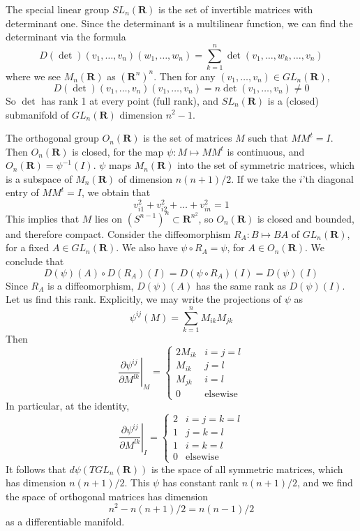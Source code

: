 \begin{example}
    The special linear group $SL_n(\mathbf{R})$ is the set of invertible matrices with determinant one. Since the determinant is a multilinear function, we can find the determinant via the formula
    \[ D(\det)(v_1, \dots, v_n)(w_1, \dots, w_n) = \sum_{k = 1}^n \det(v_1, \dots, w_k, \dots, v_n) \]
    where we see $M_n(\mathbf{R})$ as $(\mathbf{R}^n)^n$. Then for any $(v_1, \dots, v_n) \in GL_n(\mathbf{R})$,
    \[ D(\det)(v_1, \dots, v_n)(v_1, \dots, v_n) = n \det(v_1, \dots, v_n) \neq 0 \]
    So $\det$ has rank 1 at every point (full rank), and $SL_n(\mathbf{R})$ is a (closed) submanifold of $GL_n(\mathbf{R})$ dimension $n^2 - 1$.
\end{example}

\begin{example}
    The orthogonal group $O_n(\mathbf{R})$ is the set of matrices $M$ such that $MM^t = I$. Then $O_n(\mathbf{R})$ is closed, for the map $\psi: M \mapsto MM^t$ is continuous, and $O_n(\mathbf{R}) = \psi^{-1}(I)$. $\psi$ maps $M_n(\mathbf{R})$ into the set of symmetric matrices, which is a subspace of $M_n(\mathbf{R})$ of dimension $n(n+1)/2$. If we take the $i$'th diagonal entry of $MM^t = I$, we obtain that
    \[ v_{i1}^2 + v_{i2}^2 + \dots + v_{in}^2 = 1 \]
    This implies that $M$ lies on $(S^{n-1})^n \subset \mathbf{R}^{n^2}$, so $O_n(\mathbf{R})$ is closed and bounded, and therefore compact. Consider the diffeomorphism $R_A: B \mapsto BA$ of $GL_n(\mathbf{R})$, for a fixed $A \in GL_n(\mathbf{R})$. We also have $\psi \circ R_A = \psi$, for $A \in O_n(\mathbf{R})$. We conclude that
    \[ D(\psi)(A) \circ D(R_A)(I) = D(\psi \circ R_A)(I) = D(\psi)(I) \]
    Since $R_A$ is a diffeomorphism, $D(\psi)(A)$ has the same rank as $D(\psi)(I)$. Let us find this rank. Explicitly, we may write the projections of $\psi$ as
    \[ \psi^{ij}(M) = \sum_{k = 1}^n M_{ik}M_{jk} \]
    Then
    \[ \left.\frac{\partial \psi^{ij}}{\partial M^{lk}}\right|_M = \begin{cases} 2 M_{ik} & i = j = l \\ M_{ik} & j = l \\ M_{jk} & i = l \\ 0 & \text{elsewise} \end{cases} \]
    In particular, at the identity,
    \[ \left.\frac{\partial \psi^{ij}}{\partial M^{lk}}\right|_I = \begin{cases} 2 & i = j = k = l \\ 1 & j = k = l \\ 1 & i = k = l \\ 0 & \text{elsewise} \end{cases} \]
    It follows that $d\psi(TGL_n(\mathbf{R}))$ is the space of all symmetric matrices, which has dimension $n(n+1)/2$. This $\psi$ has constant rank $n(n+1)/2$, and we find the space of orthogonal matrices has dimension
    \[ n^2 - n(n+1)/2 = n(n-1)/2 \]
    as a differentiable manifold.


\end{example}
